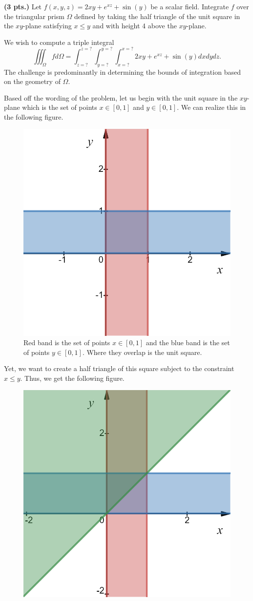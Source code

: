 \documentclass[12pt]{article} %
\begin{document}
\newpage
\begin{problem}
\textbf{(3 pts.)} Let $f(x,y,z)=2xy+e^{xz}+\sin(y)$ be a scalar field. Integrate $f$ over the triangular prism $\Omega$ defined by taking the half triangle of the unit square in the $xy$-plane satisfying $x\leq y$ and with height 4 above the $xy$-plane.
\end{problem}
\begin{solution}
We wish to compute a triple integral
\[
\iiint_{\Omega} f d\Omega = \int_{z=?}^{z=?} \int_{y=?}^{y=?} \int_{x=?}^{x=?} 2xy +e^{xz} + \sin(y) dxdydz.
\]
The challenge is predominantly in determining the bounds of integration based on the geometry of $\Omega$. 

Based off the wording of the problem, let us begin with the unit square in the $xy$-plane which is the set of points $x\in [0,1]$ and $y\in [0,1]$. We can realize this in the following figure.
\begin{figure}[H]
    \centering
    \includegraphics[width=.6\textwidth]{Figures/bounds_1.png}
    \caption{Red band is the set of points $x\in [0,1]$ and the blue band is the set of points $y\in [0,1]$. Where they overlap is the unit square.}
\end{figure}
Yet, we want to create a half triangle of this square subject to the constraint $x\leq y$. Thus, we get the following figure.
\begin{figure}[H]
    \centering
    \includegraphics[width=.6\textwidth]{Figures/bounds_2.png}

\end{figure}
\end{solution}
\end{document}
